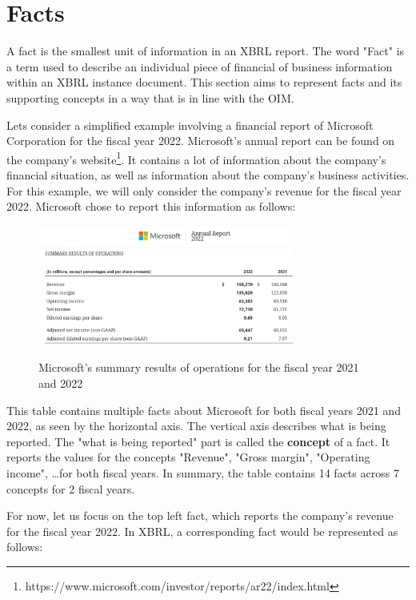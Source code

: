 \section{Facts}
\label{sec:facts}

A fact is the smallest unit of information in an XBRL report. 
The word "Fact" is a term used to describe an individual piece of financial of business information within an XBRL instance document. 
This section aims to represent facts and its supporting concepts in a way that is in line with the OIM.

Lets consider a simplified example involving a financial report of Microsoft Corporation for the fiscal year 2022.
Microsoft's annual report can be found on the company's website\footnote{https://www.microsoft.com/investor/reports/ar22/index.html}.
It contains a lot of information about the company's financial situation, as well as information about the company's business activities.
For this example, we will only consider the company's revenue for the fiscal year 2022.
Microsoft chose to report this information as follows:

\begin{figure}[H]
    \centering
    \includegraphics[width=0.75\textwidth]{images/microsoft_annual_report_2022.png}
    \caption{Microsoft's summary results of operations for the fiscal year 2021 and 2022}
    \label{fig:microsoft_annual_report_2022}
    \cite{microsoft2022ar}
\end{figure}

This table contains multiple facts about Microsoft for both fiscal years 2021 and 2022, as seen by the horizontal axis.
The vertical axis describes what is being reported. The "what is being reported" part is called the \textbf{concept} of a fact.
It reports the values for the concepts "Revenue", "Gross margin", "Operating income", \dots for both fiscal years.
In summary, the table contains 14 facts across 7 concepts for 2 fiscal years.

For now, let us focus on the top left fact, which reports the company's revenue for the fiscal year 2022.
In XBRL, a corresponding fact would be represented as follows:

